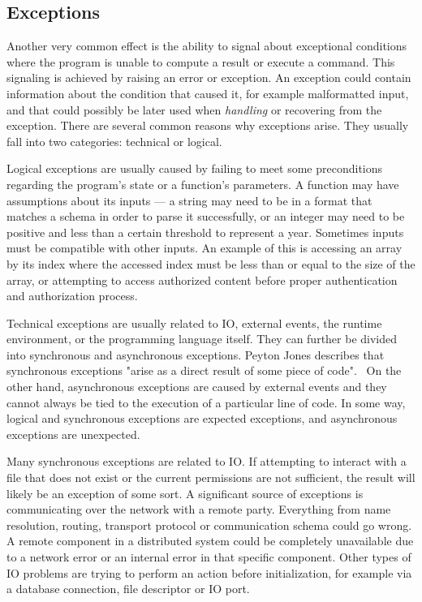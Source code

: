 \subsection{Exceptions} \label{effect-types:exceptions}
Another very common effect is the ability to signal about exceptional conditions where the program is unable to compute a result or execute a command. This signaling is achieved by raising an error or exception. An exception could contain information about the condition that caused it, for example malformatted input, and that could possibly be later used when \emph{handling} or recovering from the exception. There are several common reasons why exceptions arise. They usually fall into two categories: technical or logical.~\cite{imprecise-exceptions}

Logical exceptions are usually caused by failing to meet some preconditions regarding the program's state or a function's parameters. A function may have assumptions about its inputs --- a string may need to be in a format that matches a schema in order to parse it successfully, or an integer may need to be positive and less than a certain threshold to represent a year. Sometimes inputs must be compatible with other inputs. An example of this is accessing an array by its index where the accessed index must be less than or equal to the size of the array, or attempting to access authorized content before proper authentication and authorization process.

Technical exceptions are usually related to IO, external events, the runtime environment, or the programming language itself. They can further be divided into synchronous and asynchronous exceptions. Peyton Jones describes that synchronous exceptions "arise as a direct result of some piece of code".~\cite{akward-squad}  On the other hand, asynchronous exceptions are caused by external events and they cannot always be tied to the execution of a particular line of code. In some way, logical and synchronous exceptions are expected exceptions, and asynchronous exceptions are unexpected.

Many synchronous exceptions are related to IO. If attempting to interact with a file that does not exist or the current permissions are not sufficient, the result will likely be an exception of some sort. A significant source of exceptions is communicating over the network with a remote party. Everything from name resolution, routing, transport protocol or communication schema could go wrong. A remote component in a distributed system could be completely unavailable due to a network error or an internal error in that specific component. Other types of IO problems are trying to perform an action before initialization, for example via a database connection, file descriptor or IO port.

